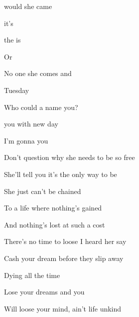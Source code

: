 

\zs
{} would    she came   

    it's   

 the  is 

Or   

No one    she comes and   
\ks

\zr
{}  Tuesday

Who could  a name  you?

 you  with  new day

 I'm gonna  you 
\kr

\zs
Don't question why she needs to be so free

She'll tell you it's the only way to be

She just can't be chained

To a life where nothing's gained

And nothing's lost at such a cost
\ks

\zr  \kr

\zs
There's no time to loose I heard her say

Cash your dream before they slip away

Dying all the time

Lose your dreams and you

Will loose your mind, ain't life unkind
\ks

\kp





